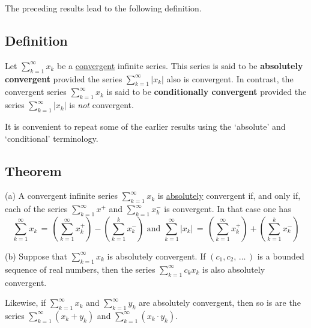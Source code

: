 \V
\V

        The preceding results lead to the following definition.

\V
\V

        \subsection{\small{{\bf Definition}}}
        \label{DefG40.40}

\V

        Let $\sum_{k=1}^{{\infty}} x_{k}$ be a \underline{convergent} infinite series.
    This series is said to be {\bf absolutely convergent} provided the series $\sum_{k=1}^{{\infty}} |x_{k}|$ also is convergent.
    In contrast, the convergent series $\sum_{k=1}^{{\infty}} x_{k}$ is said to be {\bf conditionally convergent} provided the series $\sum_{k=1}^{{\infty}} |x_{k}|$ is {\em not} convergent.

\V
\V

        It is convenient to repeat some of the earlier results using the `absolute' and `conditional' terminology.

\V

        \subsection{\small{{\bf Theorem}}}
        \label{ThmG40.50}

\V

        (a) A convergent infinite series $\sum_{k=1}^{{\infty}} x_{k}$ is \underline{absolutely} convergent if, and only if,
    each of the series $\sum_{k=1}^{{\infty}} x^{+}$ and $\sum_{k=1}^{{\infty}} x^{-}_{k}$ is convergent.
    In that case one has
        \begin{displaymath}
        \sum_{k=1}^{{\infty}} x_{k} \,=\, \left(\sum_{k=1}^{{\infty}} x^{+}_{k}\right) - \left(\sum_{k=1}^{k} x_{k}^{-}\right) \mbox{ and }
        \sum_{k=1}^{{\infty}} |x_{k}| \,=\, \left(\sum_{k=1}^{{\infty}} x^{+}_{k}\right) + \left(\sum_{k=1}^{k} x_{k}^{-}\right)
        \end{displaymath}

\V

        (b) Suppose that $\sum_{k=1}^{{\infty}} x_{k}$ is absolutely convergent.
    If $(c_{1},c_{2},\,{\ldots}\,)$ is a bounded sequence of real numbers, then the series $\sum_{k=1}^{{\infty}} c_{k}x_{k}$ is also absolutely convergent.

        Likewise, if $\sum_{k=1}^{{\infty}} x_{k}$ and $\sum_{k=1}^{{\infty}} y_{k}$ are absolutely convergent,
    then so is are the series $\sum_{k=1}^{{\infty}} (x_{k} + y_{k})$ and $\sum_{k=1}^{{\infty}} (x_{k} {\cdot} y_{k})$.

